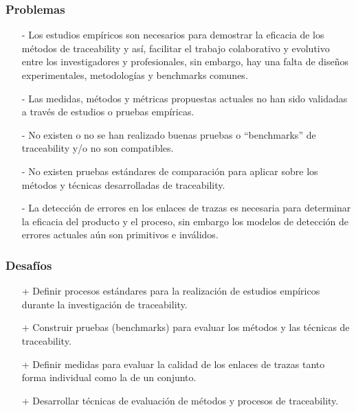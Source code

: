 \documentclass[a4paper,12pt,oneside]{book}
\begin{document}
\subsubsection{Problemas}

\begin{itemize}

\item[-]     Los estudios empíricos son necesarios para demostrar la eficacia de los métodos de traceability y así, facilitar el trabajo colaborativo y evolutivo entre los investigadores y profesionales, sin embargo, hay una falta de diseños experimentales, metodologías y benchmarks comunes.

\item[-]    Las medidas, métodos y métricas propuestas actuales no han sido validadas a través de estudios o pruebas empíricas.

\item[-]    No existen o no se han realizado buenas pruebas o “benchmarks” de traceability y/o no son compatibles.

\item[-]    No existen pruebas estándares de comparación para aplicar sobre los métodos y técnicas desarrolladas de traceability.

\item[-]    La detección de errores en los enlaces de trazas es necesaria para determinar la eficacia del producto y el proceso, sin embargo los modelos de detección de errores actuales aún son primitivos e inválidos.

\end{itemize}

\subsubsection{Desafíos}

\begin{itemize}

\item[+]     Definir procesos estándares para la realización de estudios empíricos durante la investigación de traceability.

\item[+]    Construir pruebas (benchmarks) para evaluar los métodos y las técnicas de traceability.

\item[+]    Definir medidas para evaluar la calidad de los enlaces de trazas tanto forma individual como la de un conjunto.

\item[+]    Desarrollar técnicas de evaluación de métodos y procesos de traceability.

\end{itemize}
\end{document}
